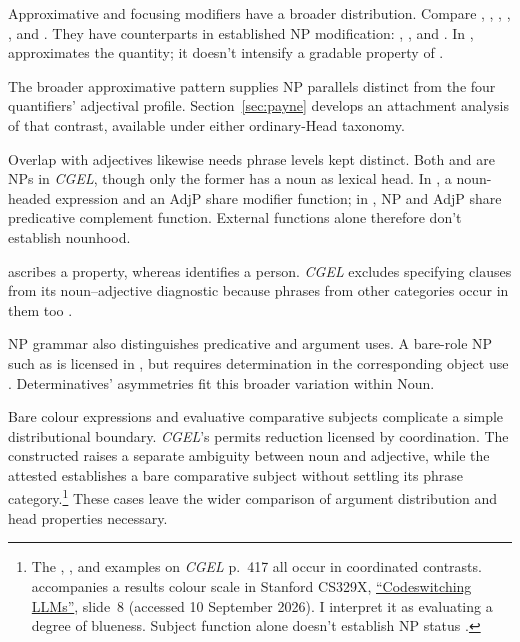 \documentclass[12pt]{article}
\begin{document}
Approximative and focusing modifiers have a broader distribution. Compare , , , , , and . They have counterparts in established NP modification: , , and . In ,  approximates the quantity; it doesn't intensify a gradable property of .

The broader approximative pattern supplies NP parallels distinct from the four quantifiers' adjectival profile. Section~\ref{sec:payne} develops an attachment analysis of that contrast, available under either ordinary-Head taxonomy.

Overlap with adjectives likewise needs phrase levels kept distinct. Both  and  are NPs in \textit{CGEL}, though only the former has a noun as lexical head. In , a noun-headed expression and an AdjP share modifier function; in , NP and AdjP share predicative complement function. External functions alone therefore don't establish nounhood.

 ascribes a property, whereas  identifies a person. \textit{CGEL} excludes specifying  clauses from its noun--adjective diagnostic because phrases from other categories occur in them too \citep[536]{huddleston2002}.

NP grammar also distinguishes predicative and argument uses. A bare-role NP such as  is licensed in , but requires determination in the corresponding object use  \citep[328]{huddleston2002}. Determinatives' asymmetries fit this broader variation within Noun.

Bare colour expressions and evaluative comparative subjects complicate a simple distributional boundary. \textit{CGEL}'s  permits reduction licensed by coordination. The constructed  raises a separate ambiguity between noun and adjective, while the attested  establishes a bare comparative subject without settling its phrase category.\footnote{The , , and  examples on \textit{CGEL} p.~417 all occur in coordinated contrasts.  accompanies a results colour scale in Stanford CS329X, \href{https://web.stanford.edu/class/cs329x/slides/Lecture12_B_Codeswitching\%20LLMs.pdf}{\enquote{Codeswitching LLMs}}, slide~8 (accessed 10 September 2026). I interpret it as evaluating a degree of blueness. Subject function alone doesn't establish NP status \citep[236]{huddleston2002}.} These cases leave the wider comparison of argument distribution and head properties necessary.
\end{document}
